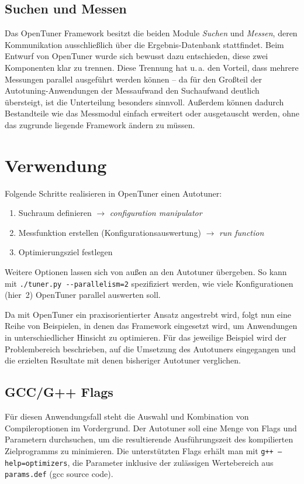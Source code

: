 \documentclass[a4paper,11pt]{scrartcl}
\newcommand{\ua}{\mbox{u.\,a.}\xspace}
\begin{document}
\subsection{Suchen und Messen}

Das OpenTuner Framework besitzt die beiden Module \emph{Suchen} und \emph{Messen},
deren Kommunikation ausschließlich über die Ergebnis-Datenbank stattfindet.
Beim Entwurf von OpenTuner wurde sich bewusst dazu entschieden, diese zwei Komponenten
klar zu trennen. Diese Trennung hat \ua den Vorteil, dass mehrere Messungen parallel 
ausgeführt werden können -- da für den Großteil der Autotuning-Anwendungen der Messaufwand
den Suchaufwand deutlich übersteigt, ist die Unterteilung besonders sinnvoll.
Außerdem können dadurch Bestandteile wie das Messmodul einfach erweitert oder 
ausgetauscht werden, ohne das zugrunde liegende Framework ändern zu müssen.



\section{Verwendung}
\label{Verwendung}
Folgende Schritte realisieren in OpenTuner einen Autotuner: 
\begin{enumerate}
  \item Suchraum definieren $\rightarrow$ \emph{configuration manipulator}
  \item Messfunktion erstellen (Konfigurationsauswertung) $\rightarrow$ \emph{run function}
  \item Optimierungsziel festlegen 
\end{enumerate}
Weitere Optionen lassen sich von außen an den Autotuner übergeben. So kann 
mit \texttt{./tuner.py -{}-parallelism=2} spezifiziert werden, wie viele Konfigurationen
(hier~2) OpenTuner parallel auswerten soll. \newline

Da mit OpenTuner ein praxisorientierter Ansatz angestrebt wird, folgt nun eine Reihe von
Beispielen, in denen das Framework eingesetzt wird, um Anwendungen in unterschiedlicher 
Hinsicht zu optimieren. Für das jeweilige Beispiel wird der Problembereich beschrieben,
auf die Umsetzung des Autotuners eingegangen und die erzielten Resultate mit denen bisheriger
Autotuner verglichen.


\subsection{GCC/G++ Flags}
Für diesen Anwendungsfall steht die Auswahl und Kombination von Compileroptionen
im Vordergrund. Der Autotuner soll eine Menge von Flags und Parametern durchsuchen,
um die resultierende Ausführungszeit des kompilierten Zielprogramms zu minimieren.
Die unterstützten Flags erhält man mit \texttt{g++ --help=optimizers}, die 
Parameter inklusive der zulässigen Wertebereich aus \texttt{params.def} (gcc source code). \newline
\end{document}

